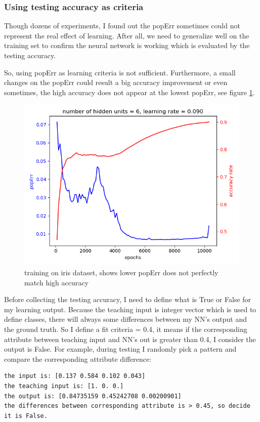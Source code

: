 \documentclass[11pt]{article}
\begin{document}
\subsubsection{Using testing accuracy as criteria}
\label{sec-3-1-1}
Though dozens of experiments, I found out the popErr sometimes could not represent the real effect of learning. After all, we need to generalize well on the training set to confirm the neural network is working which is evaluated by the testing accuracy.  

So, using popErr as learning criteria is not sufficient. Furthermore, a small changes on the popErr could result a big accuracy improvement or even sometimes, the high accuracy does not appear at the lowest popErr, see figure \ref{fig-iris-low-poperr-high-accuracy}.
\begin{figure}[htb]
\centering
\includegraphics[width=.9\linewidth]{./popErr_vs_accuracy_on_iris_oscillate02.png}
\caption{training on iris dataset, shows lower popErr does not perfectly match high accuracy \label{fig-iris-low-poperr-high-accuracy}}
\end{figure}

Before collecting the testing accuracy, I need to define what is True or False for my learning output. Because the teaching input is integer vector which is used to define classes, there will always some differences between my NN's output and the ground truth. So I define a fit criteria = 0.4, it means if the corresponding attribute between teaching input and NN's out is greater than 0.4, I consider the output is False. For example, during testing I randomly pick a pattern and compare the corresponding attribute difference:
\begin{verbatim}
the input is: [0.137 0.584 0.102 0.043]
the teaching input is: [1. 0. 0.]
the output is: [0.84735159 0.45242708 0.00200901]
the differences between corresponding attribute is > 0.45, so decide it is False.
\end{verbatim}
\end{document}
